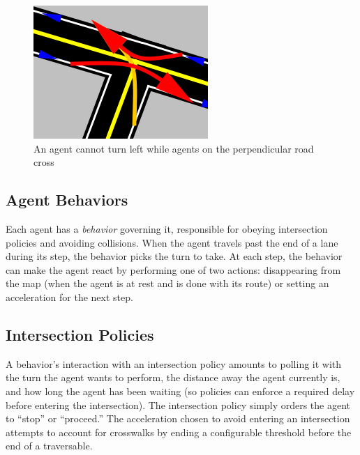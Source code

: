 \documentclass[letterpaper, 10 pt, conference]{ieeeconf}  %
\begin{document}

\begin{figure}[h]
  \centering \includegraphics[scale=0.5]{turn_conflicts.png}
  \caption{An agent cannot turn left while agents on the perpendicular road cross}
  \label{fig:conflicts}
  \vspace{-15pt}
\end{figure}

\subsection{Agent Behaviors}

Each agent has a \emph{behavior} governing it, responsible for obeying
intersection policies and avoiding collisions. When the agent travels past the
end of a lane during its step, the behavior picks the turn to take. At each
step, the behavior can make the agent react by performing one of two actions:
disappearing from the map (when the agent is at rest and is done with its route)
or setting an acceleration for the next step.

\subsection{Intersection Policies}

A behavior's interaction with an intersection policy amounts to polling it with
the turn the agent wants to perform, the distance away the agent currently is,
and how long the agent has been waiting (so policies can enforce a required
delay before entering the intersection). The intersection policy simply orders
the agent to ``stop'' or ``proceed.''  The acceleration chosen to
avoid entering an intersection attempts to account for crosswalks by ending a
configurable threshold before the end of a traversable.
\end{document}
